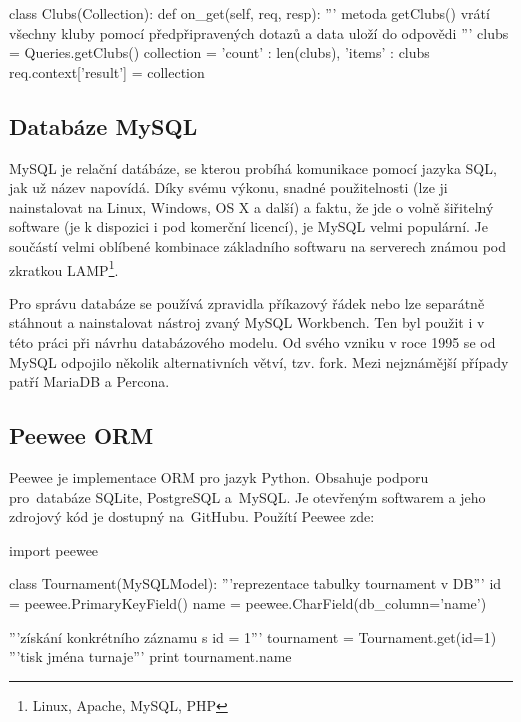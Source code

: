 \begin{python}
class Clubs(Collection):
    def on_get(self, req, resp):
        '''
        metoda getClubs() vrátí všechny kluby
        pomocí předpřipravených dotazů a data
        uloží do odpovědi
        '''
        clubs = Queries.getClubs()
        collection = {
            'count' : len(clubs),
            'items' : clubs
        }
        req.context['result'] = collection
\end{python}

\subsection{Databáze MySQL}

MySQL\cite{mysql} je relační datábáze, se kterou probíhá komunikace pomocí jazyka SQL\cite{sql}, jak už název napovídá.
Díky svému výkonu, snadné použitelnosti (lze ji nainstalovat na Linux, Windows, OS X a další) a faktu,
že jde o volně šiřitelný software (je k dispozici i pod komerční licencí),
je MySQL velmi populární. Je součástí velmi oblíbené kombinace
základního softwaru na serverech známou pod zkratkou LAMP\footnote{Linux, Apache, MySQL, PHP}.

Pro správu databáze se používá zpravidla příkazový řádek nebo lze separátně stáhnout
a nainstalovat nástroj zvaný MySQL Workbench\cite{workbench}. Ten byl použit i v této práci při návrhu databázového modelu.
Od svého vzniku v roce 1995\cite{mysql_history} se od MySQL odpojilo několik alternativních větví, tzv. fork.
Mezi nejznámější případy patří MariaDB\cite{mariadb} a Percona\cite{percona}.

\subsection{Peewee ORM}


Peewee\cite{peewee} je implementace ORM pro jazyk Python. Obsahuje podporu pro~databáze SQLite\cite{sqllite},
PostgreSQL\cite{postgresql} a~MySQL. Je otevřeným softwarem a jeho zdrojový kód je dostupný na~GitHubu. Použítí Peewee zde: 

\begin{python}
import peewee

class Tournament(MySQLModel):
   '''reprezentace tabulky tournament v DB'''
   id = peewee.PrimaryKeyField()
   name = peewee.CharField(db_column='name')

'''získání konkrétního záznamu s id = 1'''
tournament = Tournament.get(id=1)
'''tisk jména turnaje'''
print tournament.name
\end{python}

